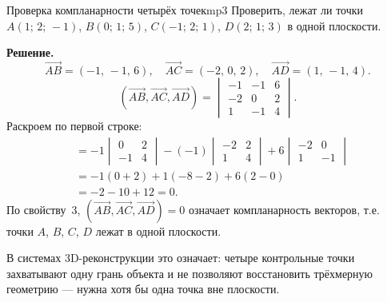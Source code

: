 \documentclass[12pt,a4paper]{article}
\begin{document}
\begin{exampleBox}{Проверка компланарности четырёх точек}{mp3}
  Проверить, лежат ли точки $A(1;\,2;\,-1)$, $B(0;\,1;\,5)$,
  $C(-1;\,2;\,1)$, $D(2;\,1;\,3)$ в одной плоскости.

  \textbf{Решение.}
  \[
    \overrightarrow{AB} = (-1,\,-1,\,6), \quad
    \overrightarrow{AC} = (-2,\,0,\,2), \quad
    \overrightarrow{AD} = (1,\,-1,\,4).
  \]
  \[
    (\overrightarrow{AB},\overrightarrow{AC},\overrightarrow{AD}) =
    \begin{vmatrix}
      -1 & -1 & 6 \\
      -2 &  0 & 2 \\
      1 & -1 & 4
    \end{vmatrix}.
  \]
  Раскроем по первой строке:
  \begin{align*}
    &= -1
    \begin{vmatrix}0&2\\-1&4
    \end{vmatrix}
    -(-1)
    \begin{vmatrix}-2&2\\1&4
    \end{vmatrix}
    +6
    \begin{vmatrix}-2&0\\1&-1
    \end{vmatrix} \\
    &= -1(0+2) + 1(-8-2) + 6(2-0) \\
    &= -2 - 10 + 12 = 0.
  \end{align*}
  По свойству~3, $(\overrightarrow{AB},\overrightarrow{AC},
  \overrightarrow{AD})=0$ означает компланарность векторов, т.е.
  точки $A$, $B$, $C$, $D$ лежат в одной плоскости.

  В системах 3D-реконструкции это означает: четыре контрольные точки
  захватывают одну грань объекта и не позволяют восстановить
  трёхмерную геометрию --- нужна хотя бы одна точка вне плоскости.
\end{exampleBox}
\end{document}
